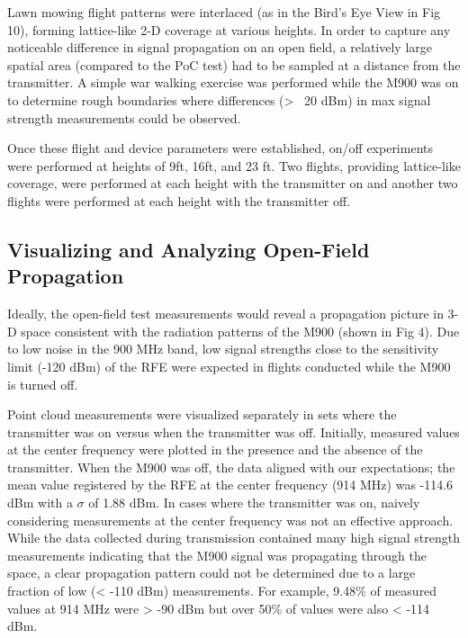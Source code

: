\documentclass[pageno]{jpaper}
\begin{document}
Lawn mowing flight patterns were interlaced (as in the Bird's Eye View in Fig 10), forming lattice-like 2-D coverage at various heights. In order to capture any noticeable difference in signal propagation on an open field, a relatively large spatial area (compared to the PoC test) had to be sampled at a distance from the transmitter. A simple war walking exercise was performed while the M900 was on to determine rough boundaries where differences (> ~20 dBm) in max signal strength measurements could be observed. 

Once these flight and device parameters were established, on/off experiments were performed at heights of 9ft, 16ft, and 23 ft. Two flights, providing lattice-like coverage, were performed at each height with the transmitter on and another two flights were performed at each height with the transmitter off. 

\subsection{Visualizing and Analyzing Open-Field Propagation}
Ideally, the open-field test measurements would reveal a propagation picture in 3-D space consistent with the radiation patterns of the M900 (shown in Fig 4). Due to low noise in the 900 MHz band, low signal strengths close to the sensitivity limit (-120 dBm)  of the RFE were expected in flights conducted while the M900 is turned off. 

Point cloud measurements were visualized separately in sets where the transmitter was on versus when the transmitter was off. Initially, measured values at the center frequency were plotted in the presence and the absence of the transmitter. When the M900 was off, the data aligned with our expectations; the mean value registered by the RFE at the center frequency (914 MHz) was -114.6 dBm with a $\sigma$ of 1.88 dBm. In cases where the transmitter was on, naively considering measurements at the center frequency was not an effective approach. While the data collected during transmission contained many high signal strength measurements indicating that the M900 signal was propagating through the space, a clear propagation pattern could not be determined due to a large fraction of low (< -110 dBm) measurements. For example, 9.48\% of measured values at 914 MHz were > -90 dBm but over 50\% of values were also < -114 dBm.
\end{document}

